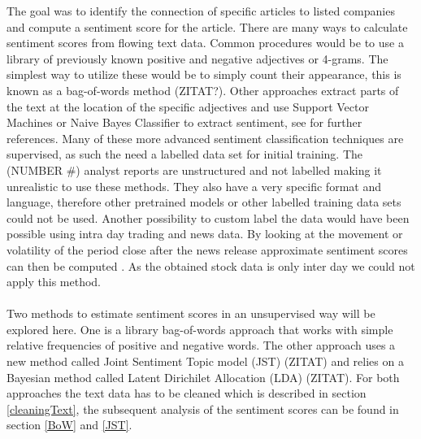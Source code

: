 The goal was to identify the connection of specific articles to listed companies and compute a sentiment score for the article. There are many ways to calculate sentiment scores from flowing text data. Common procedures would be to use a library of previously known positive and negative adjectives or 4-grams. The simplest way to utilize these would be to simply count their appearance, this is known as a bag-of-words method (ZITAT?). Other approaches extract parts of the text at the location of the specific adjectives and use Support Vector Machines or Naive Bayes Classifier to extract sentiment, see \citet{westerski2007sentiment} for further references. Many of these more advanced sentiment classification techniques are supervised, as such the need a labelled data set for initial training. The (NUMBER #) analyst reports are unstructured and not labelled making it unrealistic to use these methods. They also have a very specific format and language, therefore other pretrained models or other labelled training data sets could not be used. Another possibility to custom label the data would have been possible using intra day trading and news data. By looking at the movement or volatility of the period close after the news release approximate sentiment scores can then be computed \citep{robertson2007news}. As the obtained stock data is only inter day we could not apply this method.
\\ \\
Two methods to estimate sentiment scores in an unsupervised way will be explored here. One is a library bag-of-words approach that works with simple relative frequencies of positive and negative words. The other approach uses a new method called Joint Sentiment Topic model (JST) (ZITAT) and relies on a Bayesian method called Latent Dirichilet Allocation (LDA)  (ZITAT). For both approaches the text data has to be cleaned which is described in section \ref{cleaningText}, the subsequent analysis of the sentiment scores can be found in section \ref{BoW} and \ref{JST}.

